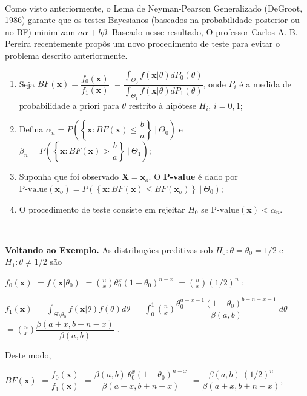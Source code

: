 \documentclass[
]{book}
\begin{document}
\(~\)

Como visto anteriormente, o Lema de Neyman-Pearson Generalizado (DeGroot, 1986) garante que os testes Bayesianos (baseados na probabilidade posterior ou no BF) minimizam \(a\alpha + b\beta\). Baseado nesse resultado, O professor Carlos A. B. Pereira recentemente propôs um novo procedimento de teste para evitar o problema descrito anteriormente.

\begin{enumerate}
\def\labelenumi{\arabic{enumi}.}
\item
  Seja \(BF(\boldsymbol x) = \dfrac{f_0(\boldsymbol x)}{f_1(\boldsymbol x)}\)
  \(=\dfrac{\displaystyle\int_{\Theta_0} f(\boldsymbol x|\theta) dP_0(\theta)}{\displaystyle \int_{\Theta_1} f(\boldsymbol x|\theta) dP_1(\theta)}\), onde \(P_i\) é a medida de probabilidade a priori para \(\theta\) restrito à hipótese \(H_i\), \(i=0,1\);
\item
  Defina
  \(\alpha_n = P\left(\left\{\boldsymbol x : BF(\boldsymbol x)\leq\dfrac{b}{a}\right\} ~\Big|~ \Theta_0\right)\) e
  \(\beta_n = P\left(\left\{\boldsymbol x : BF(\boldsymbol x)>\dfrac{b}{a}\right\} ~\Big|~ \Theta_1\right)\);
\item
  Suponha que foi observado \(\boldsymbol X=\boldsymbol x_o\). O \textbf{P-value} é dado por
  \(\text{P-value}(\boldsymbol x_o) = P\left(\left\{\boldsymbol x : BF(\boldsymbol x)\leq BF(\boldsymbol x_o)\right\} ~\Big|~ \Theta_0\right)\);
\item
  O procedimento de teste consiste em rejeitar \(H_0\) se \(\text{P-value}(\boldsymbol x) < \alpha_n\).
\end{enumerate}

\(~\)

\textbf{Voltando ao Exemplo.} As distribuções preditivas sob \(H_0: \theta=\theta_0=1/2\) e \(H_1:\theta \neq 1/2\) são

\(f_0(\boldsymbol x)\) \(= f(\boldsymbol x | \theta_0)\)
\(=\displaystyle \binom{n}{x} {\theta}_0^x (1-{\theta}_0)^{n-x}\)
\(=\displaystyle \binom{n}{x} {(1/2)^{n}}\) ;

\(f_1(\boldsymbol x)\)
\(=\displaystyle \int_{\Theta\setminus\theta_0} f(\boldsymbol x|\theta) f(\theta) d\theta\)
\(=\displaystyle \int_0^1 \binom{n}{x} \dfrac{{\theta}_0^{a+x-1} (1-{\theta}_0)^{b+n-x-1}}{\beta(a,b)}~d\theta\)
\(=\displaystyle \binom{n}{x}\dfrac{\beta(a+x,b+n-x)}{\beta(a,b)}\) .

Deste modo,

\(BF(\boldsymbol x)\) \(=\dfrac{f_0(\boldsymbol x)}{f_1(\boldsymbol x)}\)
\(=\dfrac{\beta(a,b)~{\theta}_0^x (1-{\theta}_0)^{n-x}}{\beta(a+x,b+n-x)}\)
\(=\dfrac{\beta(a,b)~(1/2)^{n}}{\beta(a+x,b+n-x)}\),
\end{document}

